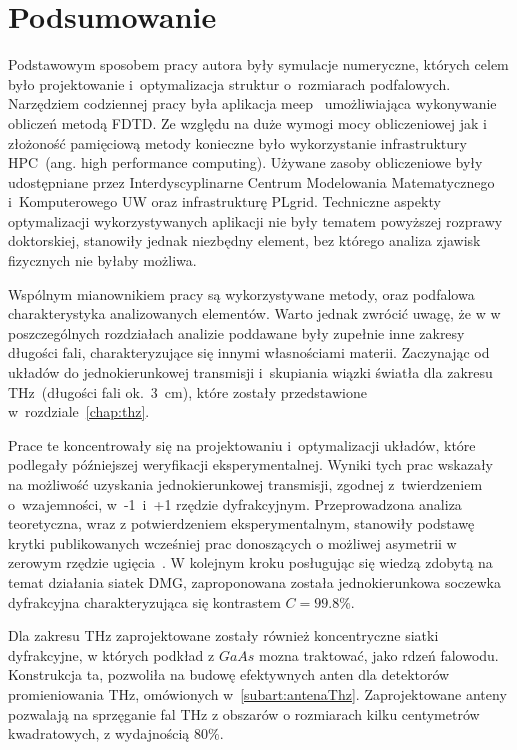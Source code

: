 \chapter{Podsumowanie}
Podstawowym sposobem pracy autora były symulacje numeryczne, których celem było projektowanie i~optymalizacja struktur o~rozmiarach podfalowych. Narzędziem codziennej pracy była aplikacja meep~\cite{OskooiRo10} umożliwiająca wykonywanie obliczeń metodą FDTD. Ze względu na duże wymogi mocy obliczeniowej jak i złożoność pamięciową metody konieczne było wykorzystanie infrastruktury HPC~(ang. high performance computing). Używane zasoby obliczeniowe były udostępniane przez Interdyscyplinarne Centrum Modelowania Matematycznego i~Komputerowego UW oraz infrastrukturę PLgrid. Techniczne aspekty optymalizacji wykorzystywanych aplikacji nie były tematem powyższej rozprawy doktorskiej, stanowiły jednak niezbędny element, bez którego analiza zjawisk fizycznych nie byłaby możliwa.

Wspólnym mianownikiem pracy są wykorzystywane metody, oraz podfalowa charakterystyka analizowanych elementów. Warto jednak zwrócić uwagę, że w w poszczególnych rozdziałach analizie poddawane były zupełnie inne zakresy długości fali, charakteryzujące się innymi własnościami materii. Zaczynając od układów do jednokierunkowej transmisji i~skupiania wiązki światła dla zakresu THz~(długości fali ok.~3~cm), które zostały przedstawione w~rozdziale~\ref{chap:thz}. 

Prace te koncentrowały się na projektowaniu i~optymalizacji układów, które podlegały późniejszej weryfikacji eksperymentalnej. Wyniki tych prac wskazały na możliwość uzyskania jednokierunkowej transmisji, zgodnej z~twierdzeniem o~wzajemności, w~-1~i~+1 rzędzie dyfrakcyjnym. Przeprowadzona analiza teoretyczna, wraz z potwierdzeniem eksperymentalnym, stanowiły podstawę krytki publikowanych wcześniej prac donoszących o możliwej asymetrii w zerowym rzędzie ugięcia~\cite{Stolarek:13}. W kolejnym kroku posługując się wiedzą zdobytą na temat działania siatek DMG, zaproponowana została jednokierunkowa soczewka dyfrakcyjna charakteryzująca się kontrastem $C=99.8\%$. 

Dla zakresu THz zaprojektowane zostały również koncentryczne siatki dyfrakcyjne, w których podkład z $GaAs$ mozna traktować, jako rdzeń falowodu. Konstrukcja ta, pozwoliła na budowę efektywnych anten dla detektorów promieniowania THz, omówionych w~\ref{subart:antenaThz}. Zaprojektowane anteny pozwalają na sprzęganie fal THz z obszarów o rozmiarach kilku centymetrów kwadratowych, z wydajnością  80\%.

